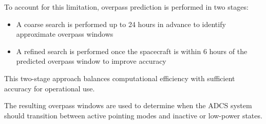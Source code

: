 To account for this limitation, overpass prediction is performed in two stages:

\begin{itemize}
	\item A coarse search is performed up to 24 hours in advance to identify approximate overpass windows
	\item A refined search is performed once the spacecraft is within 6 hours of the predicted overpass window to improve accuracy
\end{itemize}

This two-stage approach balances computational efficiency with sufficient accuracy for operational use.

The resulting overpass windows are used to determine when the ADCS system should transition between active pointing modes and inactive or low-power states.